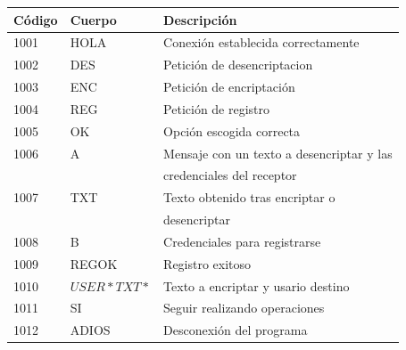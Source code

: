 \documentclass[11pt]{article}
\begin{document}
\begin{table}[h]
\centering
\begin{tabular}{|l|l|l|}
\hline
{Código} & {Cuerpo} & {Descripción}                        \\ \hline
1001                          & HOLA                          & Conexión establecida correctamente                        \\ \hline
1002                          & DES                           & Petición de desencriptacion                                     \\ \hline
1003                          & ENC                           & Petición de encriptación                                       \\ \hline
1004                          & REG                           & Petición de registro                                      \\ \hline
1005                          & OK                        	  & Opción escogida correcta                                      \\ \hline
1006                          & A                             & Mensaje con un texto a desencriptar y las\\  
							  & 							  & credenciales del receptor                                 \\ \hline
1007                          & TXT                           & Texto obtenido tras encriptar o \\
							  &                               &desencriptar \\ \hline
1008                          & B                         	  & Credenciales para registrarse                             \\ \hline
1009                          & REGOK                         & Registro exitoso                               \\ \hline
1010                          & $USER*TXT*$                   & Texto a encriptar y usario destino                            \\ \hline
1011                          & SI                            & Seguir realizando operaciones                                   \\ \hline
1012                          & ADIOS                         & Desconexión del programa                                  \\ \hline
\end{tabular}
\end{table}
\end{document}
